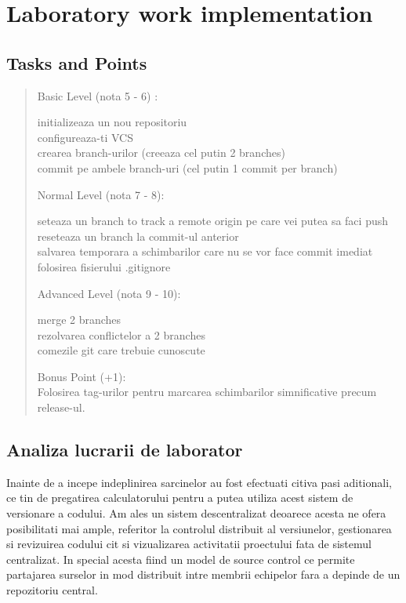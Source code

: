 \section{Laboratory work implementation}

\subsection{Tasks and Points}

\begin{quote}
\begin{description}

	\item Basic Level (nota 5 - 6) :
	
	initializeaza un nou repositoriu \\
	configureaza-ti VCS\\
	crearea branch-urilor (creeaza cel putin 2 branches)\\
	commit pe ambele branch-uri (cel putin 1 commit per branch)

	\item Normal Level (nota 7 - 8):
	
	seteaza un branch to track a remote origin pe care vei putea sa faci push\\
	reseteaza un branch la commit-ul anterior\\
	salvarea temporara a schimbarilor care nu se vor face commit imediat\\
	folosirea fisierului .gitignore
	
	\item Advanced Level (nota 9 - 10):
	
	merge 2 branches\\
	rezolvarea conflictelor a 2 branches\\
	comezile git care trebuie cunoscute
	\item Bonus Point (+1):\\
	Folosirea tag-urilor pentru marcarea schimbarilor simnificative precum release-ul.

\end{description}
\end{quote}

\subsection{Analiza lucrarii de laborator}

Inainte de a incepe indeplinirea sarcinelor au fost efectuati citiva pasi aditionali, ce tin de pregatirea calculatorului pentru a putea utiliza acest sistem de versionare a codului. Am ales un sistem descentralizat deoarece acesta ne ofera posibilitati mai ample, referitor la controlul distribuit al versiunelor, gestionarea si revizuirea codului cit si vizualizarea activitatii proectului fata de sistemul centralizat. In special acesta fiind un model de source control ce permite partajarea surselor in mod distribuit intre membrii echipelor fara a depinde de un repozitoriu central.

